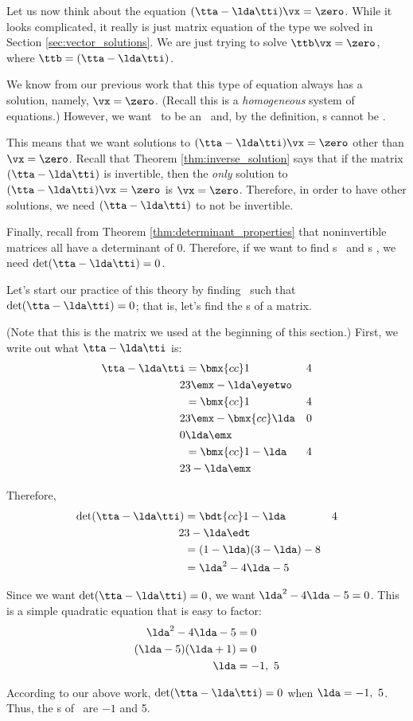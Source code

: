 Let us now think about the equation $(\tta-\lda\tti)\vx=\zero$. While it looks complicated, it really is just matrix equation of the type we solved in Section \ref{sec:vector_solutions}. We are just trying to solve $\ttb\vx=\zero$, where $\ttb = (\tta-\lda\tti)$.

We know from our previous work that this type of equation always has a solution, namely, $\vx = \zero$. (Recall this is a \textit{homogeneous} system of equations.) However, we want \vx\ to be an \ev\ and, by the definition, \ev s cannot be \zero. 

This means that we want solutions to $(\tta-\lda\tti)\vx=\zero$ other than $\vx=\zero$. Recall that Theorem \ref{thm:inverse_solution} says that if the matrix $(\tta-\lda\tti)$ is invertible, then the \textit{only} solution to $(\tta-\lda\tti)\vx=\zero$ is $\vx=\zero$. Therefore, in order to have other solutions, we need $(\tta-\lda\tti)$ to not be invertible. 

Finally, recall from Theorem \ref{thm:determinant_properties} that noninvertible matrices all have a determinant of 0. Therefore, if we want to find \el s \lda\ and \ev s \vx, we need $\det(\tta-\lda\tti) = 0$.

Let's start our practice of this theory by finding \lda\ such that $\det(\tta-\lda\tti) = 0$; that is, let's find the \el s of a matrix.

\medskip

{(Note that this is the matrix we used at the beginning of this section.) First, we write out what $\tta-\lda\tti$ is: 
\begin{align*}
\tta-\lda\tti &= \bmx{cc}1&4\\2&3\emx - \lda\eyetwo \\
							&= \bmx{cc}1&4\\2&3\emx - \bmx{cc}\lda&0\\0&\lda\emx\\
							&= \bmx{cc}1-\lda & 4 \\ 2&3-\lda\emx
\end{align*}

Therefore, 
\begin{align*}
\det(\tta-\lda\tti) &= \bdt{cc}1-\lda & 4 \\ 2&3-\lda\edt \\
										&= (1-\lda)(3-\lda)-8\\
										&= \lda^2-4\lda-5
\end{align*}

Since we want $\det(\tta-\lda\tti)=0$, we want $\lda^2-4\lda-5=0$. This is a simple quadratic equation that is easy to factor:
\begin{align*}
\lda^2-4\lda-5 &= 0\\
(\lda-5)(\lda+1) & = 0\\
\lda &= -1,\ 5
\end{align*}

According to our above work, $\det(\tta-\lda\tti)=0$ when $\lda = -1,\ 5$. Thus, the \el s of \tta\ are $-1$ and 5.}

